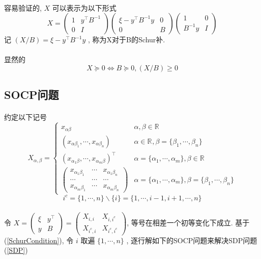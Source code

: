 \documentclass[UTF8]{ctexart}
\newcommand{\equ}[1]{\begin{equation}#1\end{equation}}
\newcommand{\Real}[1]{\mathbb{R}^{#1}}
\newcommand{\pMa}[1]{\begin{pmatrix}#1\end{pmatrix}}
\numberwithin{equation}{section}
\begin{document}
			\paragraph{}
				\quad 容易验证的, $X$ 可以表示为以下形式
			\equ{\label{Schur}
					X 
				=	\pMa{1 & y^\top B^{-1} \\ 0 & I}
					\pMa{\xi - y^\top B^{-1} y & 0 \\ 0 & B}
					\pMa{1 & 0 \\ B^{-1} y & I}
			}
			记 $(X/B) = \xi - y^\top B^{-1} y$ , 称为X对于B的Schur补.

			\paragraph{}
				\quad 显然的
				\equ{\label{SchurCondition}
					X \succeq 0 \Leftrightarrow B \succeq 0, (X/B) \geq 0
				}

		\subsection{SOCP问题}
			\paragraph{}
				\quad 约定以下记号
				\equ{
						X_{\alpha, \beta}
					=
					\begin{cases}
						x_{\alpha \beta}
							&\alpha, \beta \in \Real{}\\
						(x_{\alpha \beta_1}, \cdots, x_{\alpha \beta_n})
							&\alpha \in \Real{}, \beta = \{\beta_1, \cdots, \beta_n\}\\
						(x_{\alpha_1 \beta}, \cdots, x_{\alpha_m \beta})^\top
							&\alpha = \{\alpha_1, \cdots, \alpha_m\}, \beta \in \Real{}\\
						\pMa{
							x_{\alpha_1 \beta_1} & \cdots & x_{\alpha_1 \beta_n} \\
							\cdots & \cdots & \cdots\\
							x_{\alpha_m \beta_1} & \cdots & x_{\alpha_m \beta_n}
						}
							&\alpha = \{\alpha_1, \cdots, \alpha_m\}, \beta = \{\beta_1, \cdots, \beta_n\}
					\end{cases}
				}
				\equ{
						i^c
					=	\{1, \cdots, n\} \backslash \{i\}
					=	\{1, \cdots, i-1, i+1, \cdots, n\}
				}

			\paragraph{}
				\quad 令
				$
						X
					=	\pMa{\xi & y^\top \\ y & B}
					=	\pMa{X_{i, i} & X_{i, i^c} \\ X_{i^c, i} & X_{i^c, i^c}}
				$,
				等号在相差一个初等变化下成立. 基于(\ref{SchurCondition}), 令 $i$ 取遍 $\{1, \cdots, n\}$ , 逐行解如下的SOCP问题来解决SDP问题(\ref{SDP})
\end{document}
